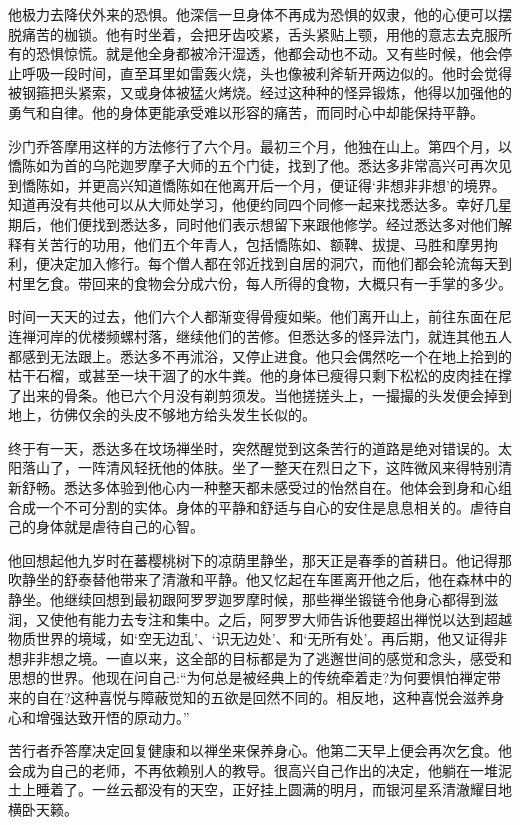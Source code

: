 \documentclass[12pt,twoside,openany]{book}
\begin{document}
他极力去降伏外来的恐惧。他深信一旦身体不再成为恐惧的奴隶，他的心便可以摆脱痛苦的枷锁。他有时坐着，会把牙齿咬紧，舌头紧贴上颚，用他的意志去克服所有的恐惧惊慌。就是他全身都被冷汗湿透，他都会动也不动。又有些时候，他会停止呼吸一段时间，直至耳里如雷轰火烧，头也像被利斧斩开两边似的。他时会觉得被钢箍把头紧索，又或身体被猛火烤烧。经过这种种的怪异锻炼，他得以加强他的勇气和自律。他的身体更能承受难以形容的痛苦，而同时心中却能保持平静。

沙门乔答摩用这样的方法修行了六个月。最初三个月，他独在山上。第四个月，以憍陈如为首的乌陀迦罗摩子大师的五个门徒，找到了他。悉达多非常高兴可再次见到憍陈如，并更高兴知道憍陈如在他离开后一个月，便证得‘非想非非想’的境界。知道再没有共他可以从大师处学习，他便约同四个同修一起来找悉达多。幸好几星期后，他们便找到悉达多，同时他们表示想留下来跟他修学。经过悉达多对他们解释有关苦行的功用，他们五个年青人，包括憍陈如、额鞞、拔提、马胜和摩男拘利，便决定加入修行。每个僧人都在邻近找到自居的洞穴，而他们都会轮流每天到村里乞食。带回来的食物会分成六份，每人所得的食物，大概只有一手掌的多少。

时间一天天的过去，他们六个人都渐变得骨瘦如柴。他们离开山上，前往东面在尼连禅河岸的优楼频螺村落，继续他们的苦修。但悉达多的怪异法门，就连其他五人都感到无法跟上。悉达多不再沭浴，又停止进食。他只会偶然吃一个在地上拾到的枯干石榴，或甚至一块干涸了的水牛粪。他的身体已瘦得只剩下松松的皮肉挂在撑了出来的骨条。他已六个月没有剃剪须发。当他搓搓头上，一撮撮的头发便会掉到地上，彷佛仅余的头皮不够地方给头发生长似的。

终于有一天，悉达多在坟场禅坐时，突然醒觉到这条苦行的道路是绝对错误的。太阳落山了，一阵清风轻抚他的体肤。坐了一整天在烈日之下，这阵微风来得特别清新舒畅。悉达多体验到他心内一种整天都未感受过的怡然自在。他体会到身和心组合成一个不可分割的实体。身体的平静和舒适与自心的安住是息息相关的。虐待自己的身体就是虐待自己的心智。

他回想起他九岁时在蕃樱桃树下的凉荫里静坐，那天正是春季的首耕日。他记得那吹静坐的舒泰替他带来了清澈和平静。他又忆起在车匿离开他之后，他在森林中的静坐。他继续回想到最初跟阿罗罗迦罗摩时候，那些禅坐锻链令他身心都得到滋润，又使他有能力去专注和集中。之后，阿罗罗大师告诉他要超出禅悦以达到超越物质世界的境域，如‘空无边乱’、‘识无边处’、和‘无所有处’。再后期，他又证得非想非非想之境。一直以来，这全部的目标都是为了逃邂世间的感觉和念头，感受和思想的世界。他现在问自己:“为何总是被经典上的传统牵着走?为何要惧怕禅定带来的自在?这种喜悦与障蔽觉知的五欲是回然不同的。相反地，这种喜悦会滋养身心和增强达致开悟的原动力。”

苦行者乔答摩决定回复健康和以禅坐来保养身心。他第二天早上便会再次乞食。他会成为自己的老师，不再依赖别人的教导。很高兴自己作出的决定，他躺在一堆泥土上睡着了。一丝云都没有的天空，正好挂上圆满的明月，而银河星系清澈耀目地横卧天籁。
\end{document}
